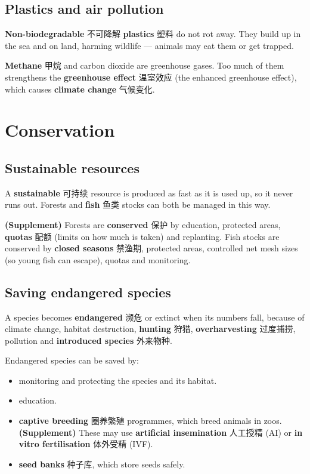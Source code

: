 \documentclass[11pt]{article}
\begin{document}
\subsection*{Plastics and air pollution}

\textbf{Non-biodegradable} 不可降解 \textbf{plastics} 塑料 do not rot away. They build up in the sea and on land, harming wildlife — animals may eat them or get trapped.

\textbf{Methane} 甲烷 and carbon dioxide are greenhouse gases. Too much of them strengthens the \textbf{greenhouse effect} 温室效应 (the enhanced greenhouse effect), which causes \textbf{climate change} 气候变化.

\section*{Conservation}

\subsection*{Sustainable resources}

A \textbf{sustainable} 可持续 resource is produced as fast as it is used up, so it never runs out. Forests and \textbf{fish} 鱼类 stocks can both be managed in this way.

\textbf{(Supplement)} Forests are \textbf{conserved} 保护 by education, protected areas, \textbf{quotas} 配额 (limits on how much is taken) and replanting. Fish stocks are conserved by \textbf{closed seasons} 禁渔期, protected areas, controlled net mesh sizes (so young fish can escape), quotas and monitoring.

\subsection*{Saving endangered species}

A species becomes \textbf{endangered} 濒危 or extinct when its numbers fall, because of climate change, habitat destruction, \textbf{hunting} 狩猎, \textbf{overharvesting} 过度捕捞, pollution and \textbf{introduced species} 外来物种.

Endangered species can be saved by:

\begin{itemize}
\item monitoring and protecting the species and its habitat.

\item education.

\item \textbf{captive breeding} 圈养繁殖 programmes, which breed animals in zoos. \textbf{(Supplement)} These may use \textbf{artificial insemination} 人工授精 (AI) or \textbf{in vitro fertilisation} 体外受精 (IVF).

\item \textbf{seed banks} 种子库, which store seeds safely.

\end{itemize}
\end{document}
